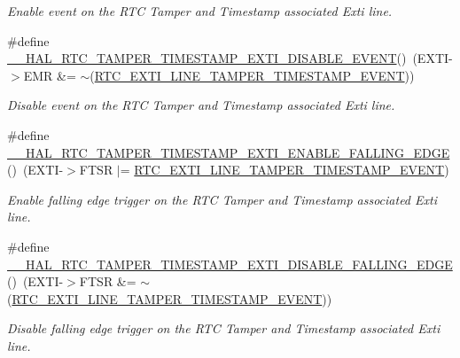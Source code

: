 \begin{DoxyCompactItemize}
\begin{DoxyCompactList}\small\item\em Enable event on the R\+TC Tamper and Timestamp associated Exti line. \end{DoxyCompactList}\item 
\#define \hyperlink{group___r_t_c_ex___tamper___timestamp_gac1d4b499ed5bda34cf9e0f69eaf5d299}{\+\_\+\+\_\+\+H\+A\+L\+\_\+\+R\+T\+C\+\_\+\+T\+A\+M\+P\+E\+R\+\_\+\+T\+I\+M\+E\+S\+T\+A\+M\+P\+\_\+\+E\+X\+T\+I\+\_\+\+D\+I\+S\+A\+B\+L\+E\+\_\+\+E\+V\+E\+NT}()~(E\+X\+TI-\/$>$E\+MR \&= $\sim$(\hyperlink{group___r_t_c_ex___private___constants_gaffa3448885f1dec216899aef7f49471f}{R\+T\+C\+\_\+\+E\+X\+T\+I\+\_\+\+L\+I\+N\+E\+\_\+\+T\+A\+M\+P\+E\+R\+\_\+\+T\+I\+M\+E\+S\+T\+A\+M\+P\+\_\+\+E\+V\+E\+NT}))
\begin{DoxyCompactList}\small\item\em Disable event on the R\+TC Tamper and Timestamp associated Exti line. \end{DoxyCompactList}\item 
\#define \hyperlink{group___r_t_c_ex___tamper___timestamp_gabb12ed2c9038c54efe541eed19fd8aa3}{\+\_\+\+\_\+\+H\+A\+L\+\_\+\+R\+T\+C\+\_\+\+T\+A\+M\+P\+E\+R\+\_\+\+T\+I\+M\+E\+S\+T\+A\+M\+P\+\_\+\+E\+X\+T\+I\+\_\+\+E\+N\+A\+B\+L\+E\+\_\+\+F\+A\+L\+L\+I\+N\+G\+\_\+\+E\+D\+GE}()~(E\+X\+TI-\/$>$F\+T\+SR $\vert$= \hyperlink{group___r_t_c_ex___private___constants_gaffa3448885f1dec216899aef7f49471f}{R\+T\+C\+\_\+\+E\+X\+T\+I\+\_\+\+L\+I\+N\+E\+\_\+\+T\+A\+M\+P\+E\+R\+\_\+\+T\+I\+M\+E\+S\+T\+A\+M\+P\+\_\+\+E\+V\+E\+NT})
\begin{DoxyCompactList}\small\item\em Enable falling edge trigger on the R\+TC Tamper and Timestamp associated Exti line. \end{DoxyCompactList}\item 
\#define \hyperlink{group___r_t_c_ex___tamper___timestamp_ga9083f587b38fcaba2d3973114a4a29b6}{\+\_\+\+\_\+\+H\+A\+L\+\_\+\+R\+T\+C\+\_\+\+T\+A\+M\+P\+E\+R\+\_\+\+T\+I\+M\+E\+S\+T\+A\+M\+P\+\_\+\+E\+X\+T\+I\+\_\+\+D\+I\+S\+A\+B\+L\+E\+\_\+\+F\+A\+L\+L\+I\+N\+G\+\_\+\+E\+D\+GE}()~(E\+X\+TI-\/$>$F\+T\+SR \&= $\sim$(\hyperlink{group___r_t_c_ex___private___constants_gaffa3448885f1dec216899aef7f49471f}{R\+T\+C\+\_\+\+E\+X\+T\+I\+\_\+\+L\+I\+N\+E\+\_\+\+T\+A\+M\+P\+E\+R\+\_\+\+T\+I\+M\+E\+S\+T\+A\+M\+P\+\_\+\+E\+V\+E\+NT}))
\begin{DoxyCompactList}\small\item\em Disable falling edge trigger on the R\+TC Tamper and Timestamp associated Exti line. \end{DoxyCompactList}\item 

\end{DoxyCompactItemize}
